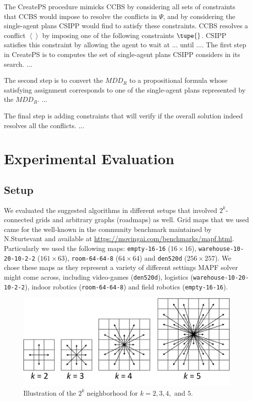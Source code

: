 \documentclass[review]{elsarticle}
\newcommand{\tuple}[1]{\ensuremath{\left \langle #1 \right \rangle }}
\newcommand{\mddr}{\ensuremath{MDD_R}\xspace}
\newcommand{\ccbs}{\ac{CCBS}\xspace}
\newcommand{\csipp}{\ac{CSIPP}\xspace}
\newcommand{\mapf}{\ac{MAPF}\xspace}
\begin{document}
The CreatePS procedure mimicks \ccbs by considering all sets of constraints that \ccbs would impose to resolve the conflicts in $\Psi$, 
and by considering the single-agent plans \csipp would find to satisfy these constraints. 
\ccbs resolves a conflict $\tuple{}$ by imposing one of the following constraints $\tupe{}$. 
\csipp satisfies this constraint by allowing the agent to wait at ... until .... 
The first step in CreatePS is to computes the set of single-agent plans \csipp considers in its search. 
...

The second step is to convert the \mddr to a propositional formula whose satisfying assignment corresponds to one of the single-agent plans 
represented by the \mddr. 
...

The final step is adding constraints that will verify if the overall solution indeed resolves all the conflicts. 
...




\section{Experimental Evaluation}
\subsection{Setup}
We evaluated the suggested algorithms in different setups that involved $2^k$-connected grids \cite{rivera2017grid} and arbitrary graphs (roadmaps) as well. Grid maps that we used came for the well-known in the community benchmark maintained by N.Sturtevant \cite{stern2019mapf} and available at \url{https://movingai.com/benchmarks/mapf.html}. Particularly we used the following maps: \texttt{empty-16-16} ($16 \times 16$), \texttt{warehouse-10-20-10-2-2} ($161 \times 63$), \texttt{room-64-64-8} ($64 \times 64$) and \texttt{den520d} ($256 \times 257$). We chose these maps as they represent a variety of different settings \mapf solver might come across, including video-games (\texttt{den520d}), logistics (\texttt{warehouse-10-20-10-2-2}), indoor robotics (\texttt{room-64-64-8}) and field robotics (\texttt{empty-16-16}).

\begin{figure}
\centering
    \centering
    \includegraphics[width=0.75\columnwidth]{2k-neighborhood.png}
    \caption{Illustration of the $2^k$ neighborhood for $k=2,3,4,$ and $5$.}
    \label{fig:2k-grids}
\end{figure}
\end{document}

